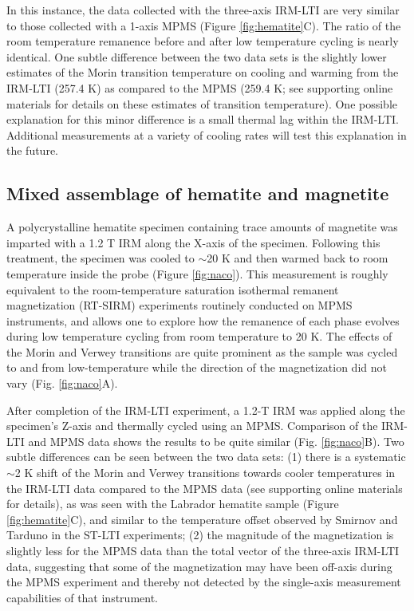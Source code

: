 \documentclass[draft,gc]{AGUTeX}
\begin{document}
\begin{article}
In this instance, the data collected with the three-axis IRM-LTI are very similar to those collected with a 1-axis MPMS (Figure \ref{fig:hematite}C).  The ratio of the room temperature remanence before and after low temperature cycling is nearly identical. One subtle difference between the two data sets is the slightly lower estimates of the Morin transition temperature on cooling and warming from the IRM-LTI (257.4 K) as compared to the MPMS (259.4 K; see supporting online materials for details on these estimates of transition temperature).  One possible explanation for this minor difference is a small thermal lag within the IRM-LTI. Additional measurements at a variety of cooling rates will test this explanation in the future.    

\subsection{Mixed assemblage of hematite and magnetite}

A polycrystalline hematite specimen containing trace amounts of magnetite was imparted with a 1.2 T IRM along the X-axis of the specimen. Following this treatment, the specimen was cooled to $\sim$20 K and then warmed back to room temperature inside the probe (Figure \ref{fig:naco}). This measurement is roughly equivalent to the room-temperature saturation isothermal remanent magnetization (RT-SIRM) experiments routinely conducted on MPMS instruments, and allows one to explore how the remanence of each phase evolves during low temperature cycling from room temperature to 20 K. The effects of the Morin and Verwey transitions are quite prominent as the sample was cycled to and from low-temperature while the direction of the magnetization did not vary (Fig. \ref{fig:naco}A).

After completion of the IRM-LTI experiment, a 1.2-T IRM was applied along the specimen's Z-axis and thermally cycled using an MPMS. Comparison of the IRM-LTI and MPMS data shows the results to be quite similar (Fig. \ref{fig:naco}B). Two subtle differences can be seen between the two data sets: (1) there is a systematic $\sim$2 K shift of the Morin and Verwey transitions towards cooler temperatures in the IRM-LTI data compared to the MPMS data (see supporting online materials for details), as was seen with the Labrador hematite sample (Figure \ref{fig:hematite}C), and similar to the temperature offset observed by Smirnov and Tarduno in the ST-LTI experiments; (2) the magnitude of the magnetization is slightly less for the MPMS data than the total vector of the three-axis IRM-LTI data, suggesting that some of the magnetization may have been off-axis during the MPMS experiment and thereby not detected by the single-axis measurement capabilities of that instrument.


\end{article}
\end{document}
